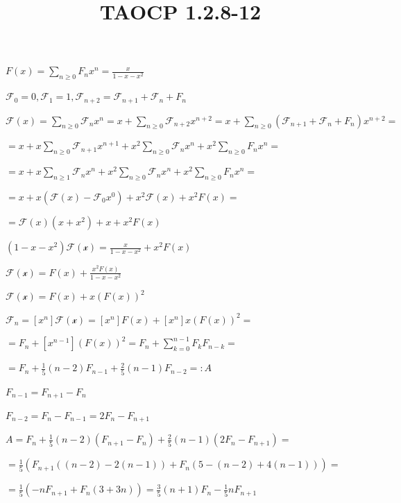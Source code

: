 \documentclass{article}
\title{TAOCP 1.2.8\mbox{-}12}
\begin{document}
\maketitle

\( F(x) = \sum_{n\geq 0}F_{n}x^{n} = \frac{x}{1-x-x^{2}} \)

\( \mathcal{F}_{0} = 0, \mathcal{F}_{1} = 1, \mathcal{F}_{n+2} = \mathcal{F}_{n+1} + \mathcal{F}_{n} + F_{n} \)

\( \mathcal{F}(x) = \sum_{n\geq 0} \mathcal{F}_{n} x^{n} = x + \sum_{n \geq 0} \mathcal{F}_{n+2}x^{n+2} = x + \sum_{n \geq 0} (\mathcal{F}_{n+1} + \mathcal{F}_{n} + F_{n})x^{n+2} = \)

\( = x + x\sum_{n \geq 0}\mathcal{F}_{n+1}x^{n+1} + x^{2}\sum_{n \geq 0}\mathcal{F}_{n}x^{n} + x^{2}\sum_{n \geq 0}F_{n}x^{n} = \)

\( = x + x\sum_{n \geq 1}\mathcal{F}_{n}x^{n} + x^{2}\sum_{n \geq 0}\mathcal{F}_{n}x^{n} + x^{2}\sum_{n \geq 0}F_{n}x^{n} = \)

\( = x + x (\mathcal{F}(x) - \mathcal{F}_{0}x^{0}) + x^{2}\mathcal{F}(x)+x^{2}F(x) = \)

\( = \mathcal{F}(x)(x+x^{2})+x+x^{2}F(x) \)

\( (1-x-x^{2})\mathcal{F(x)} = \frac{x}{1-x-x^{2}} + x^{2}F(x) \)

\( \mathcal{F(x)} = F(x) + \frac{x^{2}F(x)}{1-x-x^{2}} \)

\( \mathcal{F(x)} = F(x) + x{(F(x))}^{2} \)

\( \mathcal{F}_{n} = [x^{n}]\mathcal{F(x)} = [x^{n}]F(x) + [x^{n}]x{(F(x))}^{2} = \)

\( = F_{n} + [x^{n-1}]{(F(x))}^{2} = F_{n} + \sum_{k=0}^{n-1}F_{k}F_{n-k} = \)

\( = F_{n} + \frac{1}{5}(n-2)F_{n-1} + \frac{2}{5}(n-1)F_{n-2} =: A \)

\( F_{n-1} = F_{n+1} - F_{n} \)

\( F_{n-2} = F_{n} - F_{n-1} = 2F_{n} - F_{n+1} \)

\( A = F_{n} + \frac{1}{5}(n-2)(F_{n+1} - F_{n}) + \frac{2}{5}(n-1)(2F_{n} - F_{n+1}) = \)

\( = \frac{1}{5}(F_{n+1}((n-2)-2(n-1)) + F_{n}(5-(n-2)+4(n-1))) = \)

\( = \frac{1}{5}(-nF_{n+1} + F_{n}(3+3n)) = \frac{3}{5}(n+1)F_{n} - \frac{1}{5}nF_{n+1} \)
\end{document}
